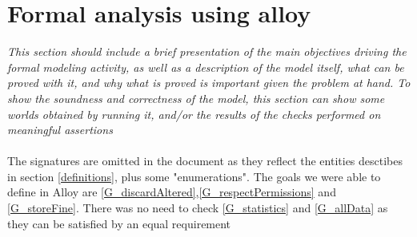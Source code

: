 \documentclass{article}
\begin{document}
\newpage
\section{Formal analysis using alloy} \textit{This section should include a brief presentation of the main objectives driving the formal modeling activity, as well as a description of the model itself, what can be proved with it, and why what is proved is important given the problem at hand. To show the soundness and correctness of the model, this section can show some worlds obtained by running it, and/or the results of the checks performed on meaningful assertions}
	\paragraph{}The signatures are omitted in the document as they reflect the entities 				desctibes in section \ref{definitions}, plus some "enumerations". The goals we were able to define in Alloy are \ref{G_discardAltered},\ref{G_respectPermissions} and \ref{G_storeFine}.
	There was no need to check \ref{G_statistics} and \ref{G_allData} as they can be satisfied 	by an equal requirement
\end{document}

